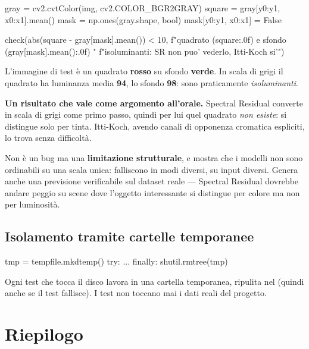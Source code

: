 \begin{idebox}
\begin{pycode}
gray = cv2.cvtColor(img, cv2.COLOR_BGR2GRAY)
square = gray[y0:y1, x0:x1].mean()
mask = np.ones(gray.shape, bool)
mask[y0:y1, x0:x1] = False

check(abs(square - gray[mask].mean()) < 10,
      f"quadrato ({square:.0f}) e sfondo ({gray[mask].mean():.0f}) "
      f"isoluminanti: SR non puo' vederlo, Itti-Koch si'")
\end{pycode}
\end{idebox}

L'immagine di test è un quadrato \textbf{rosso} su sfondo \textbf{verde}. In scala di grigi il
quadrato ha luminanza media \textbf{94}, lo sfondo \textbf{98}: sono praticamente
\emph{isoluminanti}.

\begin{nota}
\textbf{Un risultato che vale come argomento all'orale.} Spectral Residual converte in scala di
grigi come primo passo, quindi per lui quel quadrato \emph{non esiste}: si distingue solo per
tinta. Itti-Koch, avendo canali di opponenza cromatica espliciti, lo trova senza difficoltà.

\medskip
Non è un bug ma una \textbf{limitazione strutturale}, e mostra che i modelli non sono ordinabili
su una scala unica: falliscono in modi diversi, su input diversi. Genera anche una previsione
verificabile sul dataset reale --- Spectral Residual dovrebbe andare peggio su scene dove
l'oggetto interessante si distingue per colore ma non per luminosità.
\end{nota}

\subsection{Isolamento tramite cartelle temporanee}

\begin{idebox}
\begin{pycode}
tmp = tempfile.mkdtemp()
try:
    ...
finally:
    shutil.rmtree(tmp)
\end{pycode}
\end{idebox}

Ogni test che tocca il disco lavora in una cartella temporanea, ripulita nel 
(quindi anche se il test fallisce). I test non toccano mai i dati reali del progetto.

\section{Riepilogo}

